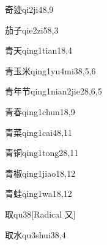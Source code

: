 \begin{verbete}{奇迹}{qi2ji4}{8,9}
\end{verbete}

\begin{verbete}{茄子}{qie2zi5}{8,3}
\end{verbete}

\begin{verbete}{青天}{qing1tian1}{8,4}
\end{verbete}

\begin{verbete}{青玉米}{qing1yu4mi3}{8,5,6}
\end{verbete}

\begin{verbete}{青年节}{qing1nian2jie2}{8,6,5}
\end{verbete}

\begin{verbete}{青春}{qing1chun1}{8,9}
\end{verbete}

\begin{verbete}{青菜}{qing1cai4}{8,11}
\end{verbete}

\begin{verbete}{青铜}{qing1tong2}{8,11}
\end{verbete}

\begin{verbete}{青椒}{qing1jiao1}{8,12}
\end{verbete}

\begin{verbete}{青蛙}{qing1wa1}{8,12}
\end{verbete}

\begin{verbete}{取}{qu3}{8}[Radical 又]
\end{verbete}

\begin{verbete}{取水}{qu3shui3}{8,4}
\end{verbete}

